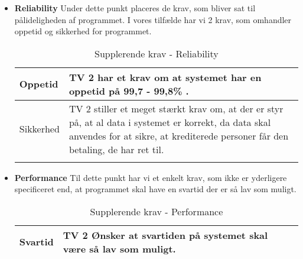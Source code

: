 \begin{itemize}
    \item \textbf{Reliability} \newline
    Under dette punkt placeres de krav, som bliver sat til pålideligheden af programmet. I vores tilfælde har vi 2 krav, som omhandler oppetid og sikkerhed for programmet. 
    
    \begin{longtable}{|p{30mm}|p{90mm}|}
        \hline
            Oppetid &  TV 2 har et krav om at systemet har en oppetid på 99,7 - 99,8\% .
        \\ \hline
            Sikkerhed & TV 2 stiller et meget stærkt krav om, at der er styr på, at al data i systemet er korrekt, da data skal anvendes for at sikre, at krediterede personer får den betaling, de har ret til.
        \\ \hline
        
    \caption{Supplerende krav - Reliability}
    \label{tab:Reliablity}
    
    \end{longtable}
    
  
\begin{comment}  %
                
        \begin{table}[H]
        \centering
        \begin{tabular}{|p{30mm}|p{90mm}|}
        \hline
            Oppetid &  TV 2 har et krav om at systemet har en oppetid på 99,7 - 99,8\% .
        \\ \hline
            Sikkerhed & TV 2 stiller et meget stærkt krav om, at der er styr på, at al data i systemet er korrekt, da data skal anvendes for at sikre, at krediterede personer får den betaling, de har ret til.
        \\ \hline
        \end{tabular}
            \caption{Supplerende krav - Reliability}
            \label{tab:Reliablity}
        \end{table}
\end{comment}
        
    
    \item \textbf{Performance} \newline
    Til dette punkt har vi et enkelt krav, som ikke er yderligere specificeret end, at programmet skal have en svartid der er så lav som muligt.
        \begin{table}[H]
            \centering
            \begin{tabular}{|p{30mm}|p{90mm}|}
            \hline
                Svartid & TV 2 Ønsker at svartiden på systemet skal være så lav som muligt.
            \\ \hline
            \end{tabular}
                \caption{Supplerende krav - Performance}
                \label{tab:Performance}
        \end{table}



\end{itemize}
